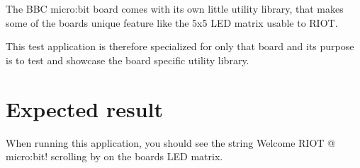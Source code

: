 The B\+BC micro\+:bit board comes with its own little utility library, that makes some of the boards unique feature like the 5x5 L\+ED matrix usable to R\+I\+OT.

This test application is therefore specialized for only that board and its purpose is to test and showcase the board specific utility library.

\section*{Expected result }

When running this application, you should see the string {\ttfamily Welcome R\+I\+OT @ micro\+:bit!} scrolling by on the boards L\+ED matrix. 
